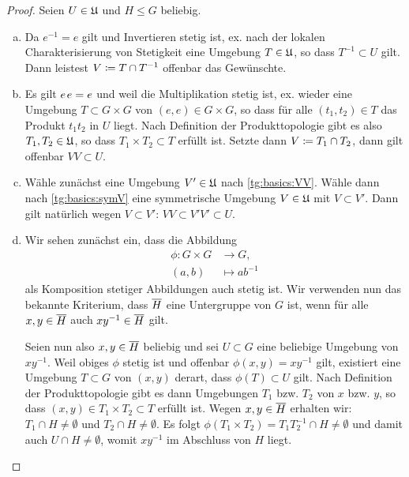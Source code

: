 \begin{proof}
    Seien $U\in\mathfrak{U}$ und $H\leq G$ beliebig.
    \begin{enumerate}[(a)]
        \item
            Da $e^{-1} = e$ gilt und Invertieren stetig ist, ex. nach der
            lokalen Charakterisierung von Stetigkeit eine Umgebung $T\in\mathfrak{U}$,
            so dass $T^{-1} \subset U$ gilt.
            Dann leistest $V \coloneqq T \cap T^{-1}$ offenbar das Gewünschte.
        
        \item
            Es gilt $e\mkern2mu e=e$ und weil die Multiplikation stetig ist, ex. wieder
            eine Umgebung $T\subset G\times G$ von $(e,e)\in G\times G$, so dass 
            für alle $(t_1,t_2)\in T$ das Produkt $t_1t_2$ in $U$ liegt.
            Nach Definition der Produkttopologie gibt es also
            $T_1,T_2\in\mathfrak{U}$, so dass $T_1\times T_2 \subset T$ erfüllt ist.
            Setzte dann $V\coloneqq T_1\cap T_2$, dann gilt offenbar $VV\subset U$.

        \item
            Wähle zunächst eine Umgebung $V'\in\mathfrak{U}$ nach
            \ref{tg:basics:VV}. Wähle dann nach \ref{tg:basics:symV} eine
            symmetrische Umgebung $V\in\mathfrak{U}$ mit $V\subset V'$. Dann gilt
            natürlich wegen $V\subset V'$: $VV \subset V'V' \subset U$.

        \item
            Wir sehen zunächst ein, dass die Abbildung
            \begin{align*}
                \phi\colon G\times G &\to G,    \\
                            (a,b)    &\mapsto ab^{-1}
            \end{align*}
            als Komposition stetiger Abbildungen auch stetig ist. Wir verwenden
            nun das bekannte Kriterium, dass $\overline{H}$ eine Untergruppe
            von $G$ ist, wenn für alle $x,y\in\overline{H}$ auch
            $xy^{-1}\in\overline{H}$ gilt.
            
            Seien nun also $x,y \in \overline{H}$ beliebig und sei $U\subset G$
            eine beliebige Umgebung von $xy^{-1}$. Weil obiges $\phi$ stetig
            ist und offenbar $\phi(x,y)=xy^{-1}$ gilt, existiert eine Umgebung
            $T\subset G$ von $(x,y)$ derart, dass $\phi(T) \subset U$ gilt. Nach
            Definition der Produkttopologie gibt es dann Umgebungen $T_1$ bzw.
            $T_2$ von $x$ bzw. $y$, so dass $(x,y) \in T_1\times T_2 \subset T$
            erfüllt ist. Wegen $x,y\in\overline{H}$ erhalten wir: 
            $T_1\cap H\neq\emptyset$ und $T_2\cap H\neq\emptyset$. Es folgt
            $\phi(T_1\times T_2)=T_1 T_2^{-1}\cap H\neq\emptyset$ und damit auch
            $U\cap H\neq\emptyset$, womit $xy^{-1}$ im Abschluss von $H$ liegt. 


\end{enumerate}
\end{proof}
